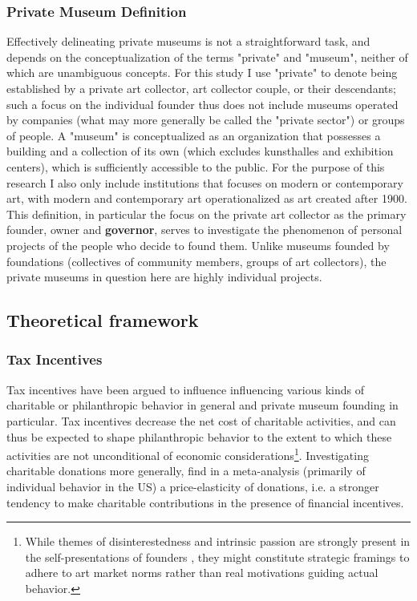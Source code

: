 \documentclass[11pt]{article}
\begin{document}
\subsubsection*{Private Museum Definition}

Effectively delineating private museums is not a straightforward task, and depends on the conceptualization of the terms "private" and "museum", neither of which are unambiguous concepts.
For this study I use "private" to denote being established by a private art collector, art collector couple, or their descendants; such a focus on the individual founder thus does not include museums operated by companies (what may more generally be called the "private sector") or groups of people.
A "museum" is conceptualized as an organization that possesses a building and a collection of its own (which excludes kunsthalles and exhibition centers), which is sufficiently accessible to the public.
For the purpose of this research I also only include institutions that focuses on modern or contemporary art, with modern and contemporary art operationalized as art created after 1900.
This definition, in particular the focus on the private art collector as the primary founder, owner and \textbf{governor}, serves to investigate the phenomenon of personal projects of the people who decide to found them.
Unlike museums founded by foundations (collectives of community members, groups of art collectors), the private museums in question here are highly individual projects.




\subsection*{Theoretical framework}




\subsubsection*{Tax Incentives}





Tax incentives have been argued to influence influencing various kinds of charitable or philanthropic behavior in general and private museum founding in particular.
Tax incentives decrease the net cost of charitable activities, and can thus be expected to shape philanthropic behavior to the extent to which these activities are not unconditional of economic considerations\footnote{While themes of disinterestedness and intrinsic passion are strongly present in the self-presentations of founders \parencite{Bechtler_Imhof_2018_future,Duron_2020_rebaudengo}, they might constitute strategic framings to adhere to art market norms \parencite{Velthuis_2007_talking} rather than real motivations guiding actual behavior.}. 
Investigating charitable donations more generally, \textcite{Peloza_Steel_2005_elasticities} find in a meta-analysis (primarily of individual behavior in the US) a price-elasticity of donations, i.e. a stronger tendency to make charitable contributions in the presence of financial incentives.
\end{document}
